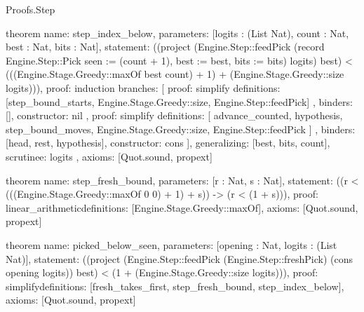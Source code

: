 \begin{lexlean}{Proofs.Step}
\begin{semanticmodule}
theorem{
  name: step_index_below,
  parameters: [logits : (List Nat), count : Nat, best : Nat, bits : Nat],
  statement: ((project (Engine.Step::feedPick (record Engine.Step::Pick {seen := (count + 1), best := best, bits := bits}) logits) best) < (((Engine.Stage.Greedy::maxOf best count) + 1) + (Engine.Stage.Greedy::size logits))),
  proof: induction{
    branches: [
      {
        proof: simplify{
          definitions: [step_bound_starts, Engine.Stage.Greedy::size, Engine.Step::feedPick]
        },
        binders: [],
        constructor: nil
      },
      {
        proof: simplify{
          definitions: [
            advance_counted,
            hypothesis,
            step_bound_moves,
            Engine.Stage.Greedy::size,
            Engine.Step::feedPick
          ]
        },
        binders: [head, rest, hypothesis],
        constructor: cons
      }
    ],
    generalizing: [best, bits, count],
    scrutinee: logits
  },
  axioms: [Quot.sound, propext]
}

theorem{
  name: step_fresh_bound,
  parameters: [r : Nat, s : Nat],
  statement: ((r < (((Engine.Stage.Greedy::maxOf 0 0) + 1) + s)) -> (r < (1 + s))),
  proof: linear_arithmetic{definitions: [Engine.Stage.Greedy::maxOf]},
  axioms: [Quot.sound, propext]
}

theorem{
  name: picked_below_seen,
  parameters: [opening : Nat, logits : (List Nat)],
  statement: ((project (Engine.Step::feedPick (Engine.Step::freshPick) (cons opening logits)) best) < (1 + (Engine.Stage.Greedy::size logits))),
  proof: simplify{definitions: [fresh_takes_first, step_fresh_bound, step_index_below]},
  axioms: [Quot.sound, propext]
}
\end{semanticmodule}
\end{lexlean}
